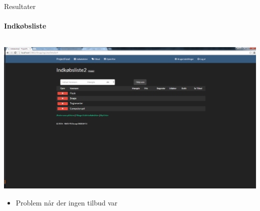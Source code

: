 \begin{frame}{Resultater}
\framesubtitle{Indkøbsliste}

	\begin{minipage}[0.3\textheight]{\textwidth}
	\begin{columns}[T]
	\begin{column}{1\textwidth}
	\vspace{-15 pt}
	 \includegraphics[width=1\textwidth,height=1\textheight,keepaspectratio, trim={1cm 0 0 16mm}, clip]{images/Screenshots/ShoppingListOld.png}
	 
	 \begin{itemize}
	 	\item Problem når der ingen tilbud var
	 \end{itemize}
	
	\end{column}

	\end{columns}

  \end{minipage}
	
\end{frame}
